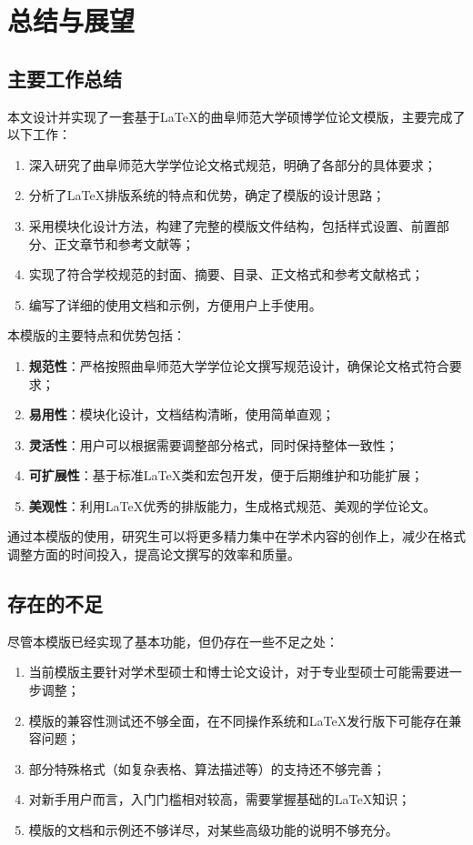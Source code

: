 \section{总结与展望}

\subsection{主要工作总结}
本文设计并实现了一套基于\LaTeX{}的曲阜师范大学硕博学位论文模版，主要完成了以下工作：

\begin{enumerate}
    \item 深入研究了曲阜师范大学学位论文格式规范，明确了各部分的具体要求；
    \item 分析了\LaTeX{}排版系统的特点和优势，确定了模版的设计思路；
    \item 采用模块化设计方法，构建了完整的模版文件结构，包括样式设置、前置部分、正文章节和参考文献等；
    \item 实现了符合学校规范的封面、摘要、目录、正文格式和参考文献格式；
    \item 编写了详细的使用文档和示例，方便用户上手使用。
\end{enumerate}

本模版的主要特点和优势包括：

\begin{enumerate}
    \item \textbf{规范性}：严格按照曲阜师范大学学位论文撰写规范设计，确保论文格式符合要求；
    \item \textbf{易用性}：模块化设计，文档结构清晰，使用简单直观；
    \item \textbf{灵活性}：用户可以根据需要调整部分格式，同时保持整体一致性；
    \item \textbf{可扩展性}：基于标准\LaTeX{}类和宏包开发，便于后期维护和功能扩展；
    \item \textbf{美观性}：利用\LaTeX{}优秀的排版能力，生成格式规范、美观的学位论文。
\end{enumerate}

通过本模版的使用，研究生可以将更多精力集中在学术内容的创作上，减少在格式调整方面的时间投入，提高论文撰写的效率和质量。

\subsection{存在的不足}
尽管本模版已经实现了基本功能，但仍存在一些不足之处：

\begin{enumerate}
    \item 当前模版主要针对学术型硕士和博士论文设计，对于专业型硕士可能需要进一步调整；
    \item 模版的兼容性测试还不够全面，在不同操作系统和\LaTeX{}发行版下可能存在兼容问题；
    \item 部分特殊格式（如复杂表格、算法描述等）的支持还不够完善；
    \item 对新手用户而言，入门门槛相对较高，需要掌握基础的\LaTeX{}知识；
    \item 模版的文档和示例还不够详尽，对某些高级功能的说明不够充分。
\end{enumerate}

